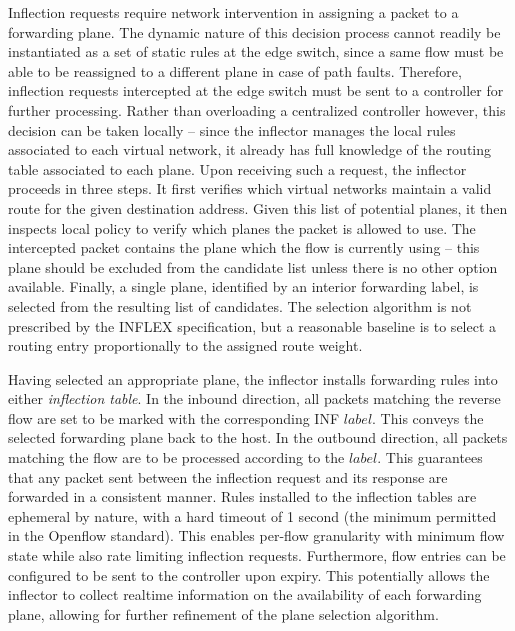 Inflection requests require network intervention in assigning a packet to a forwarding plane.
The dynamic nature of this decision process cannot readily be instantiated as a set of static rules at the edge switch, since a same flow must be able to be reassigned to a different plane in case of path faults.
Therefore, inflection requests intercepted at the edge switch must be sent to a controller for further processing.
Rather than overloading a centralized controller however, this decision can be taken locally -- since the inflector manages the local rules associated to each virtual network, it already has full knowledge of the routing table associated to each plane.
Upon receiving such a request, the inflector proceeds in three steps.
It first verifies which virtual networks maintain a valid route for the given destination address.
Given this list of potential planes, it then inspects local policy to verify which planes the packet is allowed to use.
The intercepted packet contains the plane which the flow is currently using -- this plane should be excluded from the candidate list unless there is no other option available.
Finally, a single plane, identified by an interior forwarding label, is selected from the resulting list of candidates.
The selection algorithm is not prescribed by the INFLEX specification, but a reasonable baseline is to select a routing entry proportionally to the assigned route weight.

Having selected an appropriate plane, the inflector installs forwarding rules into either \emph{inflection table}.
In the inbound direction, all packets matching the reverse flow are set to be marked with the corresponding \ac{INF} $label$.
This conveys the selected forwarding plane back to the host.
In the outbound direction, all packets matching the flow are to be processed according to the $label$.
This guarantees that any packet sent between the inflection request and its response are forwarded in a consistent manner.
Rules installed to the inflection tables are ephemeral by nature, with a hard timeout of 1 second (the minimum permitted in the Openflow standard).
This enables per-flow granularity with minimum flow state while also rate limiting inflection requests.
Furthermore, flow entries can be configured to be sent to the controller upon expiry.
This potentially allows the inflector to collect realtime information on the availability of each forwarding plane, allowing for further refinement of the plane selection algorithm.
